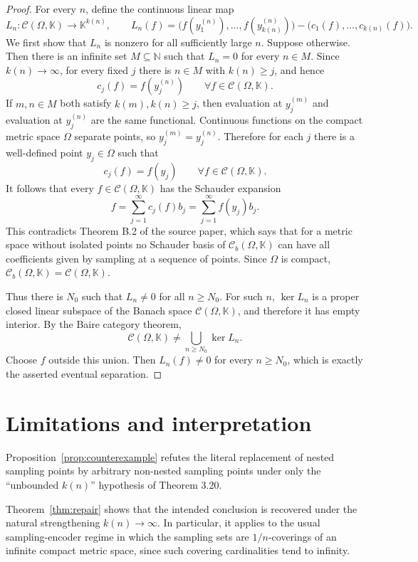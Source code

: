 \documentclass[11pt]{article}
\newcommand{\K}{\mathbb K}
\newcommand{\N}{\mathbb N}
\newcommand{\C}{\mathcal C}
\newcommand{\OmegaX}{\Omega}
\begin{document}
\begin{proof}
For every $n$, define the continuous linear map
\[
  L_n:\C(\OmegaX,\K)\to \K^{k(n)},\qquad
  L_n(f)=
  \bigl(f(y_1^{(n)}),\ldots,f(y_{k(n)}^{(n)})\bigr)
  -
  \bigl(c_1(f),\ldots,c_{k(n)}(f)\bigr).
\]
We first show that $L_n$ is nonzero for all sufficiently large $n$.
Suppose otherwise.  Then there is an infinite set $M\subseteq\N$ such that
$L_n=0$ for every $n\in M$.  Since $k(n)\to\infty$, for every fixed $j$ there
is $n\in M$ with $k(n)\ge j$, and hence
\[
  c_j(f)=f(y_j^{(n)})\qquad \forall f\in\C(\OmegaX,\K).
\]
If $m,n\in M$ both satisfy $k(m),k(n)\ge j$, then evaluation at
$y_j^{(m)}$ and evaluation at $y_j^{(n)}$ are the same functional.  Continuous
functions on the compact metric space $\OmegaX$ separate points, so
$y_j^{(m)}=y_j^{(n)}$.  Therefore for each $j$ there is a well-defined point
$y_j\in\OmegaX$ such that
\[
  c_j(f)=f(y_j)\qquad \forall f\in\C(\OmegaX,\K).
\]
It follows that every $f\in\C(\OmegaX,\K)$ has the Schauder expansion
\[
  f=\sum_{j=1}^\infty c_j(f)b_j
   =\sum_{j=1}^\infty f(y_j)b_j .
\]
This contradicts Theorem B.2 of the source paper, which says that for a metric
space without isolated points no Schauder basis of $\C_b(\OmegaX,\K)$ can have
all coefficients given by sampling at a sequence of points.  Since $\OmegaX$
is compact, $\C_b(\OmegaX,\K)=\C(\OmegaX,\K)$.

Thus there is $N_0$ such that $L_n\ne 0$ for all $n\ge N_0$.  For such $n$,
$\ker L_n$ is a proper closed linear subspace of the Banach space
$\C(\OmegaX,\K)$, and therefore it has empty interior.  By the Baire category
theorem,
\[
  \C(\OmegaX,\K)\ne \bigcup_{n\ge N_0}\ker L_n .
\]
Choose $f$ outside this union.  Then $L_n(f)\ne 0$ for every $n\ge N_0$, which
is exactly the asserted eventual separation.
\end{proof}

\section*{Limitations and interpretation}

Proposition~\ref{prop:counterexample} refutes the literal replacement of
nested sampling points by arbitrary non-nested sampling points under only the
``unbounded $k(n)$'' hypothesis of Theorem 3.20.

Theorem~\ref{thm:repair} shows that the intended conclusion is recovered under
the natural strengthening $k(n)\to\infty$.  In particular, it applies to the
usual sampling-encoder regime in which the sampling sets are $1/n$-coverings
of an infinite compact metric space, since such covering cardinalities tend to
infinity.
\end{document}
